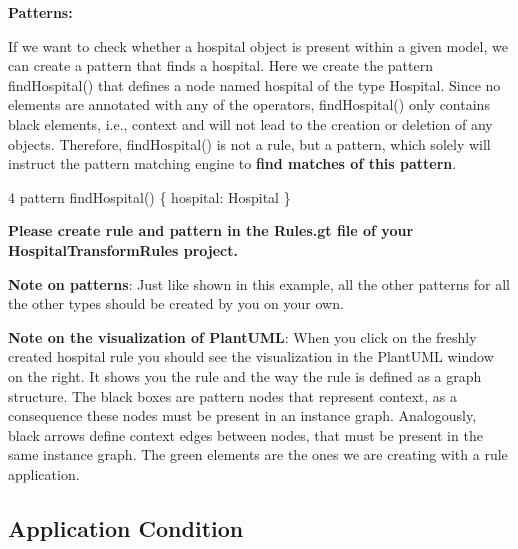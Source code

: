 \textbf{Patterns:}

If we want to check whether a hospital object is present within a given model, we can create a pattern that finds a hospital. Here we create the pattern \textsf{findHospital()} that defines a node named hospital of the type Hospital. Since no elements are annotated with any of the operators, findHospital() only contains black elements, i.e., context and will not lead to the creation or deletion of any objects.\newline
Therefore, findHospital() is not a rule, but a pattern, which solely will instruct the pattern matching engine to \textbf{find matches of this pattern}.\newline

{

4 \hspace{0.5cm}	{\color{Purple}pattern} findHospital() \{ \hspace{1cm}	hospital: Hospital \hspace{0.5cm}	\}\newline

}

\textbf{Please create rule and pattern in the \textsf{Rules.gt} file of your \textsf{HospitalTransformRules} project.}\newline

\textbf{Note on patterns}:
\newline
Just like shown in this example, all the other patterns for all the other types should be created by you on your own.\newline

\textbf{Note on the visualization of PlantUML}:
\newline
When you click on the freshly created hospital rule you should see the visualization in the PlantUML window on the right. It shows you the rule and the way the rule is defined as a graph structure. The black boxes are pattern nodes that represent context, as a consequence these nodes must be present in an instance graph. Analogously, black arrows define context edges between nodes, that must be present in the same instance graph. The green elements are the ones we are creating with a rule application.

\clearpage

\subsection{Application Condition}

